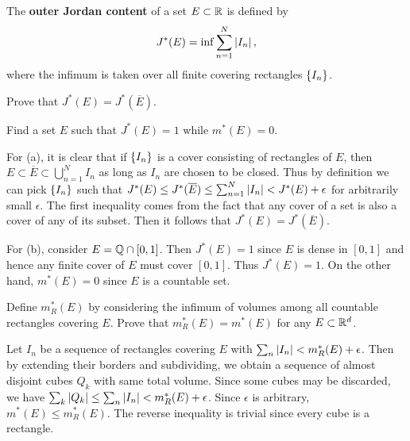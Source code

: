 \begin{exercise}
    The \textbf{outer Jordan content} of a set $E\subset\mathbb{R}$ is 
    defined by
    \[
        J^*(E) = \inf\sum_{n=1}^{N}\left\lvert {I_n} \right\rvert,
    \]
    where the infimum is taken over all finite covering 
    rectangles $\left\{ {I_n} \right\}$.
    \begin{thmenum}
        \item Prove that $J^*(E) = J^*(\overline{E})$.
        \item Find a set $E$ such that $J^*(E) = 1$ while 
        $m^*(E) = 0$.
    \end{thmenum}
\end{exercise}
\begin{pf}
    For (a), it is clear that if $\left\{ {I_n} \right\}$ is a cover 
    consisting of rectangles of $E$, then $E\subset\overline{E}
    \subset\bigcup_{n=1}^N I_n$ as long as $I_n$ are chosen to 
    be closed. Thus by definition we can pick $\left\{ {I_n} \right\}$ such 
    that $J^*(E)\leq J^*(\overline{E})\leq
    \sum_{n=1}^{N}\left\lvert {I_n} \right\rvert < J^*(E)+\epsilon$ 
    for arbitrarily small $\epsilon$. The first inequality 
    comes from the fact that any cover of a set is also a cover
    of any of its subset. Then it follows that $J^*(E) 
    = J^*(\overline{E})$.

    For (b), consider $E = \mathbb{Q}\cap[0,1]$. Then $J^*(E) = 1$ 
    since $E$ is dense in $[0,1]$ and hence any finite cover 
    of $E$ must cover $[0,1]$. Thus $J^*(E) = 1$. On the other 
    hand, $m^*(E) = 0$ since $E$ is a countable set. 
\end{pf}

\begin{exercise}
    Define $m^*_R(E)$ by considering the infimum of volumes 
    among all countable rectangles covering $E$. Prove that 
    $m^*_R(E) = m^*(E)$ for any $E\subset\mathbb{R}^d$.
\end{exercise}
\begin{pf}
    Let $I_n$ be a sequence of rectangles covering $E$ with
    $\sum_n \left\lvert {I_n} \right\rvert < m^*_R(E)+\epsilon$. Then by extending 
    their borders and subdividing, we obtain a sequence of 
    almost disjoint cubes $Q_k$ with same total volume. Since 
    some cubes may be discarded, we have $\sum_k\left\lvert {Q_k} \right\rvert\leq
    \sum_n \left\lvert {I_n} \right\rvert < m^*_R(E)+\epsilon$. Since $\epsilon$ is
    arbitrary, $m^*(E)\leq m^*_R(E)$. The reverse inequality 
    is trivial since every cube is a rectangle.  
\end{pf}


